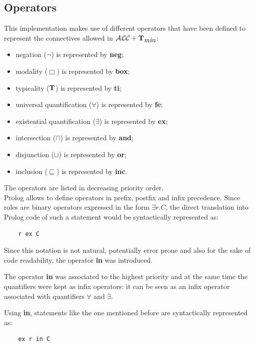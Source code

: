 \documentclass[a4paper, 11pt, oneside]{duthesis}
\newcommand{\tip}{{\bf T}}
\newcommand{\alctmin}{\mathcal{ALC}+\tip_{\mbox{\em min}}}
\newcommand{\perogni} {\forall}
\newcommand{\esiste} {\exists}
\begin{document}
\subsection{Operators}\label{prolog_operators}

This implementation makes use of different operators that have been defined to represent the connectives allowed in $\alctmin$:

\begin{itemize}
\item negation ($\neg$) is represented by \textbf{neg};
\item modality ($\Box$) is represented by \textbf{box};
\item typicality ($\tip$) is represented by \textbf{ti};
\item universal quantification ($\perogni$) is represented by \textbf{fe};
\item existential quantification ($\esiste$) is represented by \textbf{ex};
\item intersection ($\sqcap$) is represented by \textbf{and};
\item disjunction ($\sqcup$) is represented by \textbf{or};
\item inclusion ($\sqsubseteq$) is represented by \textbf{inc}.
\end{itemize}

The operators are listed in decreasing priority order.\\

Prolog allows to define operators in prefix, postfix and infix precedence.
Since roles are binary operators expressed in the form $\esiste r.C$, the direct translation into Prolog code of such a statement would be syntactically represented as:
\begin{verbatim}
    r ex C
\end{verbatim}
Since this notation is not natural, potentially error prone and also for the sake of code readability, the operator \textbf{in} was introduced.

The operator \textbf{in} was associated to the highest priority and at the same time the quantifiers were kept as infix operators: it can be seen as an infix operator associated with quantifiers $\perogni$ and $\esiste$.

Using \textbf{in}, statements like the one mentioned before are syntactically represented as:
\begin{verbatim}
    ex r in C
\end{verbatim}
\end{document}
